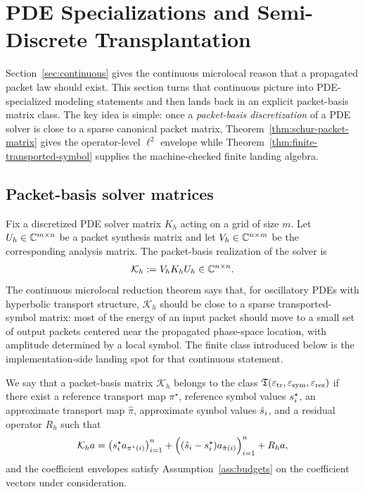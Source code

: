 \section{PDE Specializations and Semi-Discrete Transplantation}
\label{sec:pde}

Section~\ref{sec:continuous} gives the continuous microlocal reason that a propagated packet law should exist. This section turns that continuous picture into PDE-specialized modeling statements and then lands back in an explicit packet-basis matrix class. The key idea is simple: once a \emph{packet-basis discretization} of a PDE solver is close to a sparse canonical packet matrix, Theorem~\ref{thm:schur-packet-matrix} gives the operator-level $\ell^2$ envelope while Theorem~\ref{thm:finite-transported-symbol} supplies the machine-checked finite landing algebra.

\subsection{Packet-basis solver matrices}

Fix a discretized PDE solver matrix $K_h$ acting on a grid of size $m$. Let $U_h\in\mathbb C^{m\times n}$ be a packet synthesis matrix and let $V_h\in\mathbb C^{n\times m}$ be the corresponding analysis matrix. The packet-basis realization of the solver is
\[
\mathcal K_h := V_h K_h U_h \in \mathbb C^{n\times n}.
\]
The continuous microlocal reduction theorem says that, for oscillatory PDEs with hyperbolic transport structure, $\mathcal K_h$ should be close to a sparse transported-symbol matrix: most of the energy of an input packet should move to a small set of output packets centered near the propagated phase-space location, with amplitude determined by a local symbol. The finite class introduced below is the implementation-side landing spot for that continuous statement.

\begin{definition}
\label{def:ts-class}
We say that a packet-basis matrix $\mathcal K_h$ belongs to the class $\mathfrak T(\varepsilon_{\mathrm{tr}},\varepsilon_{\mathrm{sym}},\varepsilon_{\mathrm{res}})$ if there exist a reference transport map $\pi^\star$, reference symbol values $s^\star_i$, an approximate transport map $\hat\pi$, approximate symbol values $\hat s_i$, and a residual operator $R_h$ such that
\[
\mathcal K_h a = \bigl(s^\star_i a_{\pi^\star(i)}\bigr)_{i=1}^n
 + \Bigl((\hat s_i-s^\star_i)a_{\hat\pi(i)}\Bigr)_{i=1}^n
 + R_h a,
\]
and the coefficient envelopes satisfy Assumption~\ref{ass:budgets} on the coefficient vectors under consideration.
\end{definition}

